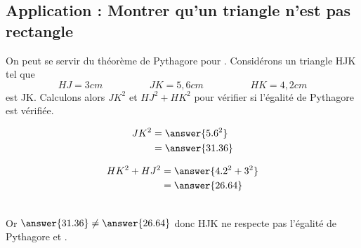 \subsection{Application : Montrer qu'un triangle n'est pas rectangle}
\begin{exemplebox}
    On peut se servir du théorème de Pythagore pour . 
    \newline
    \newline
    Considérons un triangle HJK tel que 
    $$HJ=3cm\hspace{2cm}JK=5,6cm\hspace{2cm}HK=4,2cm$$
     est JK. Calculons alors $JK^2$ et $HJ^2+HK^2$ pour
    vérifier si l'égalité de Pythagore est vérifiée.\\
    \begin{minipage}{0.48\textwidth}
        \begin{align*}
            JK^2&=\answer{5.6^2}\\
            &=\answer{31.36}\\
        \end{align*}
    \end{minipage}
    \hfill
    \begin{minipage}{0.48\textwidth}
        \begin{align*}
            HK^2+HJ^2&=\answer{4.2^2+3^2}\\
            &=\answer{26.64}\\
        \end{align*}
    \end{minipage}\\
    Or $\answer{31.36} \neq \answer{26.64}$ donc HJK ne respecte pas l'égalité
    de Pythagore et .
\end{exemplebox}
